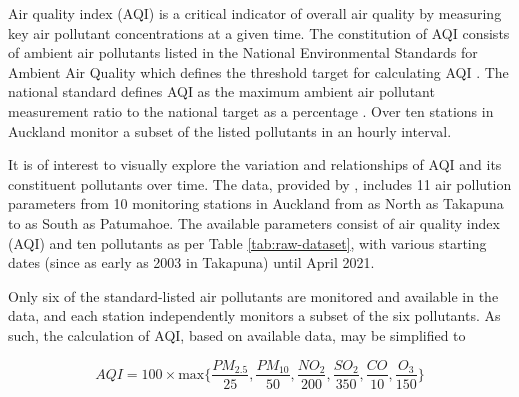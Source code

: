 \documentclass{aucklandthesis}
\begin{document}
Air quality index (AQI) is a critical indicator of overall air quality by measuring key air pollutant concentrations at a given time. The constitution of AQI consists of ambient air pollutants listed in the National Environmental Standards for Ambient Air Quality which defines the threshold target for calculating AQI \autocite{aqi}. The national standard defines AQI as the maximum ambient air pollutant measurement ratio to the national target as a percentage \autocite{aqitarget}. Over ten stations in Auckland monitor a subset of the listed pollutants in an hourly interval.

It is of interest to visually explore the variation and relationships of AQI and its constituent pollutants over time. The data, provided by \textcite{aklenvdata}, includes 11 air pollution parameters from 10 monitoring stations in Auckland from as North as Takapuna to as South as Patumahoe. The available parameters consist of air quality index (AQI) and ten pollutants as per Table \ref{tab:raw-dataset}, with various starting dates (since as early as 2003 in Takapuna) until April 2021.

Only six of the standard-listed air pollutants are monitored and available in the data, and each station independently monitors a subset of the six pollutants. As such, the calculation of AQI, based on available data, may be simplified to

\begin{equation}\label{eq:aqicon} AQI = 100 \times \textrm{max}\{\frac{PM_{2.5}}{25}, \frac{PM_{10}}{50}, \frac{NO_{2}}{200}, \frac{SO_{2}}{350}, \frac{CO}{10}, \frac{O_{3}}{150}\} \end{equation}
\end{document}
